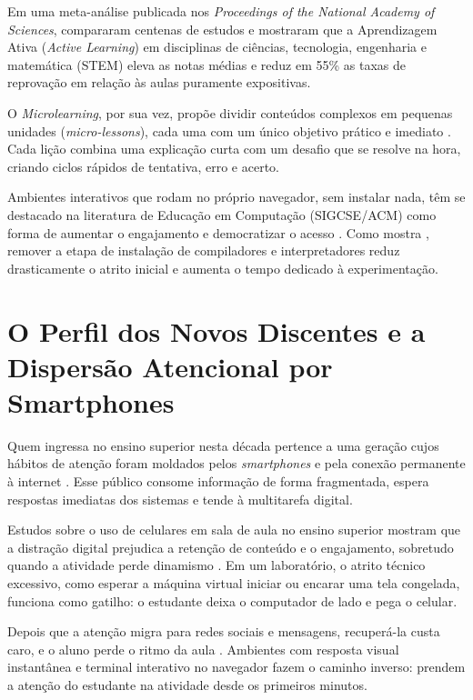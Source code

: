 Em uma meta-análise publicada nos \textit{Proceedings of the National Academy of Sciences},  compararam centenas de estudos e mostraram que a Aprendizagem Ativa (\textit{Active Learning}) em disciplinas de ciências, tecnologia, engenharia e matemática (STEM) eleva as notas médias e reduz em 55\% as taxas de reprovação em relação às aulas puramente expositivas.

O \textit{Microlearning}, por sua vez, propõe dividir conteúdos complexos em pequenas unidades (\textit{micro-lessons}), cada uma com um único objetivo prático e imediato \cite{kapp2019microlearning}. Cada lição combina uma explicação curta com um desafio que se resolve na hora, criando ciclos rápidos de tentativa, erro e acerto.

Ambientes interativos que rodam no próprio navegador, sem instalar nada, têm se destacado na literatura de Educação em Computação (SIGCSE/ACM) como forma de aumentar o engajamento e democratizar o acesso \cite{guo2013online, silva2021ensino}. Como mostra , remover a etapa de instalação de compiladores e interpretadores reduz drasticamente o atrito inicial e aumenta o tempo dedicado à experimentação.

\section{O Perfil dos Novos Discentes e a Dispersão Atencional por Smartphones}
\label{sec:dispersao-smartphones}

Quem ingressa no ensino superior nesta década pertence a uma geração cujos hábitos de atenção foram moldados pelos \textit{smartphones} e pela conexão permanente à internet \cite{kuznekoff2013impact}. Esse público consome informação de forma fragmentada, espera respostas imediatas dos sistemas e tende à multitarefa digital.

Estudos sobre o uso de celulares em sala de aula no ensino superior mostram que a distração digital prejudica a retenção de conteúdo e o engajamento, sobretudo quando a atividade perde dinamismo \cite{kuznekoff2013impact}. Em um laboratório, o atrito técnico excessivo, como esperar a máquina virtual iniciar ou encarar uma tela congelada, funciona como gatilho: o estudante deixa o computador de lado e pega o celular.

Depois que a atenção migra para redes sociais e mensagens, recuperá-la custa caro, e o aluno perde o ritmo da aula \cite{kuznekoff2013impact, silva2021ensino}. Ambientes com resposta visual instantânea e terminal interativo no navegador fazem o caminho inverso: prendem a atenção do estudante na atividade desde os primeiros minutos.
